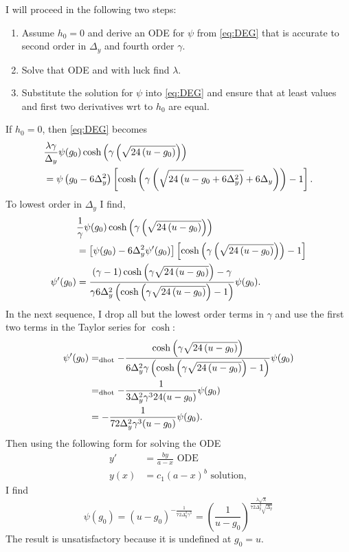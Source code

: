 \documentclass[twocolumn]{article}
\newcommand{\dhot}{=_{\text{dhot}}}
\begin{document}
I will proceed in the following two steps:
\begin{enumerate}
\item Assume $h_0=0$ and derive an ODE for $\psi$ from \eqref{eq:DEG}
  that is accurate to second order in $\Delta_y$ and fourth order
  $\gamma$.
\item Solve that ODE and with luck find $\lambda$.
\item Substitute the solution for $\psi$ into \eqref{eq:DEG} and
  ensure that at least values and first two derivatives wrt to $h_0$
  are equal.
\end{enumerate}

If $h_0 = 0$, then \eqref{eq:DEG} becomes
\renewcommand{\temp}{g_0 - 6\Delta_y^2}
\renewcommand{\mtemp}{-g_0 +6\Delta_y^2}
\begin{align*}
  & \frac{\lambda \gamma}{\Delta_y} \psi(g_0) \cosh \left( \gamma
    \left( \Rad{-g_0} \right) \right) \\
  &= \psi\left( \temp \right)
  \left[ \cosh
    \left( \gamma
      \left( \Rad{\mtemp} + 6 \Delta_y \right)
    \right) -1
  \right].
\end{align*}
To lowest order in $\Delta_y$ I find,
\newcommand{\coshg}{\cosh\left(\gamma \Rad{-g_0} \right)}
\begin{align*}
  & \frac{1}{\gamma} \psi(g_0)
  \cosh \left( \gamma \left( \Rad{-g_0} \right) \right) \\
  &= \left[\psi(g_0) - 6\Delta_y^2\psi'(g_0) \right]
  \left[ \cosh \left( \gamma \left( \Rad{-g_0} \right) \right) - 1
  \right] \\
  \psi'(g_0) &= \frac{(\gamma-1)\coshg - \gamma }{\gamma 6 \Delta_y^2
  \left( \coshg - 1 \right)} \psi(g_0).
\end{align*}
In the next sequence, I drop all but the lowest order terms in
$\gamma$ and use the first two terms in the Taylor series for
$\cosh$:
\begin{align*}
  \psi'(g_0) &\dhot -\frac{\coshg}{6\Delta_y^2 \gamma \left( \coshg -
      1 \right)} \psi(g_0) \\
  &\dhot -\frac{1}{3 \Delta_y^2 \gamma^3 24(u-g_0)} \psi(g_0) \\
  &= -\frac{1}{72 \Delta_y^2 \gamma^3 (u-g_0)} \psi(g_0).
\end{align*}
Then using the following form for solving the ODE
\begin{align*}
  y' &= \frac{by}{a-x} \text{ ODE} \\
  y(x) &= c_1 (a-x)^b \text{ solution},
\end{align*}
I find
\begin{equation}
  \label{eq:1}
  \psi(g_0) = (u - g_0)^{-\frac{1}{72 \Delta_y^2 \gamma^3}} =
  \left( \frac{1}{u - g_0} \right)^{\frac{\lambda \sqrt{\lambda}}{72
      \Delta_y^3 \sqrt{\Delta_y}}}
\end{equation}
The result is unsatisfactory because it is undefined at $g_0 = u$.
\end{document}
